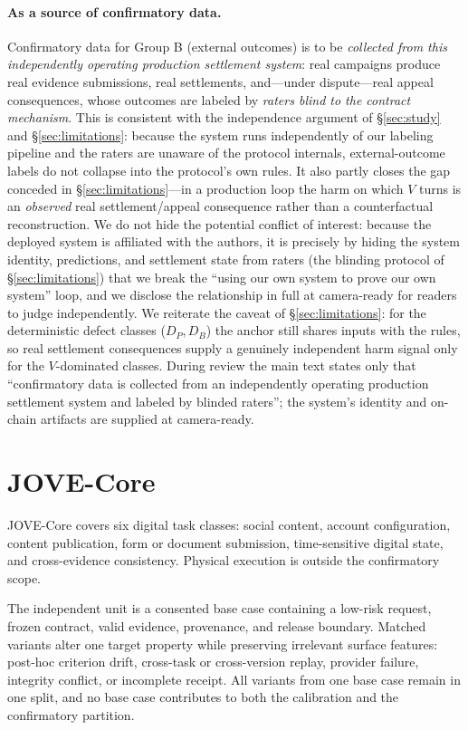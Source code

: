 \documentclass[sigconf,anonymous,review]{acmart}
\begin{document}
\paragraph{As a source of confirmatory data.} Confirmatory data for Group B (external outcomes) is to be \emph{collected from this independently operating production settlement system}: real campaigns produce real evidence submissions, real settlements, and---under dispute---real appeal consequences, whose outcomes are labeled by \emph{raters blind to the contract mechanism}. This is consistent with the independence argument of \S\ref{sec:study} and \S\ref{sec:limitations}: because the system runs independently of our labeling pipeline and the raters are unaware of the protocol internals, external-outcome labels do not collapse into the protocol's own rules. It also partly closes the gap conceded in \S\ref{sec:limitations}---in a production loop the harm on which $V$ turns is an \emph{observed} real settlement/appeal consequence rather than a counterfactual reconstruction. We do not hide the potential conflict of interest: because the deployed system is affiliated with the authors, it is precisely by hiding the system identity, predictions, and settlement state from raters (the blinding protocol of \S\ref{sec:limitations}) that we break the ``using our own system to prove our own system'' loop, and we disclose the relationship in full at camera-ready for readers to judge independently. We reiterate the caveat of \S\ref{sec:limitations}: for the deterministic defect classes ($D_P,D_B$) the anchor still shares inputs with the rules, so real settlement consequences supply a genuinely independent harm signal only for the $V$-dominated classes. During review the main text states only that ``confirmatory data is collected from an independently operating production settlement system and labeled by blinded raters''; the system's identity and on-chain artifacts are supplied at camera-ready.

\section{JOVE-Core}
JOVE-Core covers six digital task classes: social content, account configuration, content publication, form or document submission, time-sensitive digital state, and cross-evidence consistency. Physical execution is outside the confirmatory scope.

The independent unit is a consented base case containing a low-risk request, frozen contract, valid evidence, provenance, and release boundary. Matched variants alter one target property while preserving irrelevant surface features: post-hoc criterion drift, cross-task or cross-version replay, provider failure, integrity conflict, or incomplete receipt. All variants from one base case remain in one split, and no base case contributes to both the calibration and the confirmatory partition.
\end{document}
